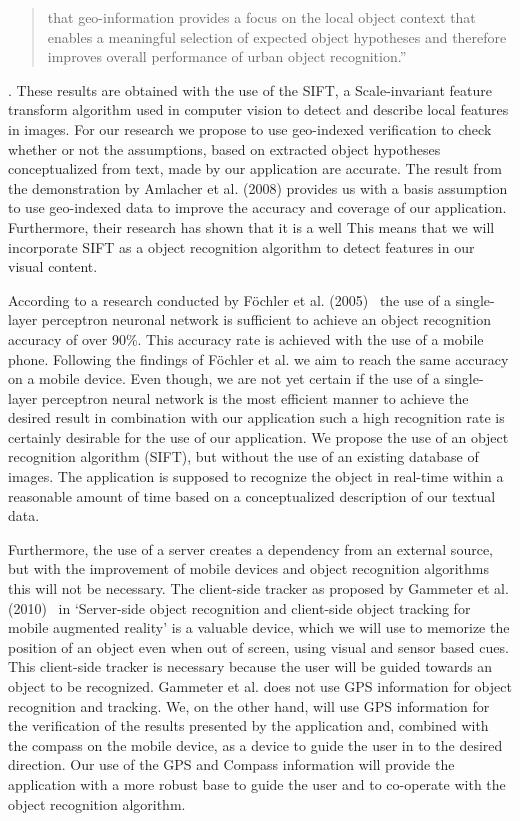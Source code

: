 \documentclass[12pt ,twocolumn]{article}
\begin{document}
\begin{quotation}
that geo-information provides a focus on the local object context that enables a meaningful selection of expected object hypotheses and therefore improves overall performance of urban object recognition.” 
\end{quotation}. These results are obtained with the use of the SIFT, a Scale-invariant feature transform algorithm used in computer vision to detect and describe local features in images. For our research we propose to use geo-indexed verification to check whether or not the assumptions, based on extracted object hypotheses conceptualized from text, made by our application are accurate. The result from the demonstration by Amlacher et al. (2008) provides us with a basis assumption to use geo-indexed data to improve the accuracy and coverage of our application. Furthermore, their research has shown that it is a well This means that we will incorporate SIFT as a object recognition algorithm to detect features in our visual content.

According to a research conducted by F\"{o}chler et al. (2005)~\cite{Fockler:2005:PMG:1149488.1149490} the use of a single-layer perceptron neuronal network is sufficient to achieve an object recognition accuracy of over 90\%. This accuracy rate is achieved with the use of a mobile phone. Following the findings of F\"{o}chler et al. we aim to reach the same accuracy on a mobile device. Even though, we are not yet certain if the use of a single-layer perceptron neural network is the most efficient manner to achieve the desired result in combination with our application such a high recognition rate is certainly desirable for the use of our application. We propose the use of an object recognition algorithm (SIFT), but without the use of an existing database of images. The application is supposed to recognize the object in real-time within a reasonable amount of time based on a conceptualized description of our textual data.

Furthermore, the use of a server creates a dependency from an external source, but with the improvement of mobile devices and object recognition algorithms this will not be necessary.
The client-side tracker as proposed by Gammeter et al. (2010)~\cite{eth_biwi_00782} in ‘Server-side object recognition and client-side object tracking for mobile augmented reality’ is a valuable device, which we will use to memorize the position of an object even when out of screen, using visual and sensor based cues. This client-side tracker is necessary because the user will be guided towards an object to be recognized. Gammeter et al. does not use GPS information for object recognition and tracking. We, on the other hand, will use GPS information for the verification of the results presented by the application and, combined with the compass on the mobile device, as a device to guide the user in to the desired direction. Our use of the GPS and Compass information will provide the application with a more robust base to guide the user and to co-operate with the object recognition algorithm.
\end{document}
